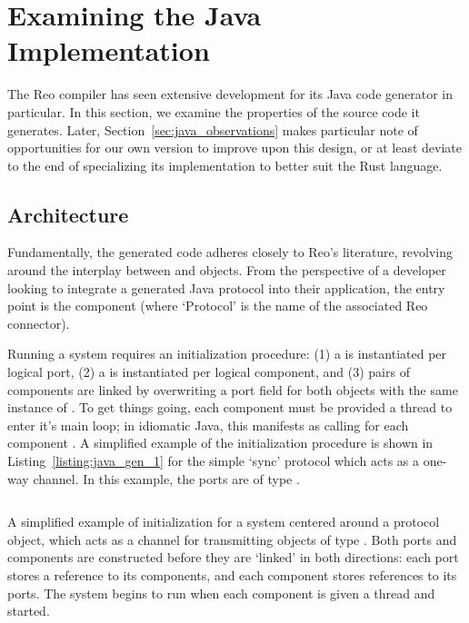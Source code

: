 \section{Examining the Java Implementation}
\label{sec:java_examined}
The Reo compiler has seen extensive development for its Java code generator in particular. In this section, we examine the properties of the source code it generates. Later, Section~\ref{sec:java_observations} makes particular note of opportunities for our own version to improve upon this design, or at least deviate to the end of specializing its implementation to better suit the Rust language.

\subsection{Architecture}
Fundamentally, the generated code adheres closely to Reo's literature, revolving around the interplay between  and  objects. From the perspective of a developer looking to integrate a generated Java protocol into their application, the entry point is the  component (where `Protocol' is the name of the associated Reo connector).

Running a system requires an initialization procedure: (1) a  is instantiated per logical port, (2) a  is instantiated per logical component, and (3) pairs of components are linked by overwriting a port field for both objects with the same instance of . To get things going, each component must be provided a thread to enter it's main loop; in idiomatic Java, this manifests as calling  for each component . A simplified example of the initialization procedure is shown in Listing~\ref{listing:java_gen_1} for the simple `sync' protocol which acts as a one-way channel. In this example, the ports are of type .


\begin{listing}[ht]
	\centering
	\inputminted[]{java}{java_gen_1.java}
	\caption[Reo-generated Java protocol initialization.]{A simplified example of initialization for a system centered around a  protocol object, which acts as a channel for transmitting objects of type . Both ports and components are constructed before they are `linked' in both directions: each port stores a reference to its components, and each component stores references to its ports. The system begins to run when each component is given a thread and started.}
	\label{listing:java_gen_1}
\end{listing}


